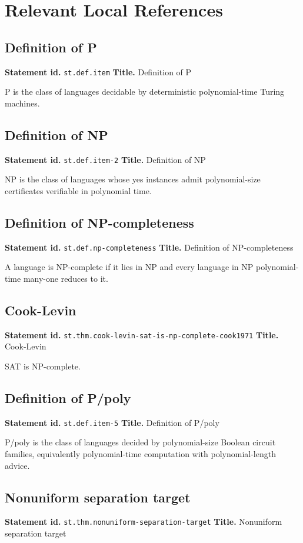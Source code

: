 \documentclass[11pt]{article}
\begin{document}
\section{Relevant Local References}
\subsection*{Definition of P}
\textbf{Statement id.} \texttt{st.def.item}
\textbf{Title.} Definition of P

P is the class of languages decidable by deterministic polynomial-time Turing machines.
\subsection*{Definition of NP}
\textbf{Statement id.} \texttt{st.def.item-2}
\textbf{Title.} Definition of NP

NP is the class of languages whose yes instances admit polynomial-size certificates verifiable in polynomial time.
\subsection*{Definition of NP-completeness}
\textbf{Statement id.} \texttt{st.def.np-completeness}
\textbf{Title.} Definition of NP-completeness

A language is NP-complete if it lies in NP and every language in NP polynomial-time many-one reduces to it.
\subsection*{Cook-Levin}
\textbf{Statement id.} \texttt{st.thm.cook-levin-sat-is-np-complete-cook1971}
\textbf{Title.} Cook-Levin

SAT is NP-complete.
\subsection*{Definition of P/poly}
\textbf{Statement id.} \texttt{st.def.item-5}
\textbf{Title.} Definition of P/poly

P/poly is the class of languages decided by polynomial-size Boolean circuit families, equivalently polynomial-time computation with polynomial-length advice.
\subsection*{Nonuniform separation target}
\textbf{Statement id.} \texttt{st.thm.nonuniform-separation-target}
\textbf{Title.} Nonuniform separation target
\end{document}
